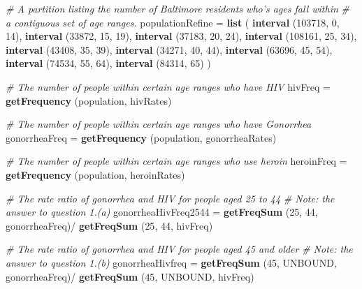 \documentclass[]{article}
\newenvironment{Shaded}{}{}
\newcommand{\CommentTok}[1]{\textcolor[rgb]{0.38,0.63,0.69}{\textit{#1}}}
\newcommand{\DecValTok}[1]{\textcolor[rgb]{0.25,0.63,0.44}{#1}}
\newcommand{\KeywordTok}[1]{\textcolor[rgb]{0.00,0.44,0.13}{\textbf{#1}}}
\newcommand{\NormalTok}[1]{#1}
\newcommand{\OperatorTok}[1]{\textcolor[rgb]{0.40,0.40,0.40}{#1}}
\newcommand{\StringTok}[1]{\textcolor[rgb]{0.25,0.44,0.63}{#1}}
\begin{document}
\begin{Shaded}
\begin{Highlighting}[]
\CommentTok{# A partition listing the number of Baltimore residents who's ages fall within}
\CommentTok{# a contiguous set of age ranges.}
\NormalTok{populationRefine =}\StringTok{ }\KeywordTok{list}\NormalTok{ (}
  \KeywordTok{interval}\NormalTok{ (}\DecValTok{103718}\NormalTok{, }\DecValTok{0}\NormalTok{, }\DecValTok{14}\NormalTok{),}
  \KeywordTok{interval}\NormalTok{ (}\DecValTok{33872}\NormalTok{, }\DecValTok{15}\NormalTok{, }\DecValTok{19}\NormalTok{),}
  \KeywordTok{interval}\NormalTok{ (}\DecValTok{37183}\NormalTok{, }\DecValTok{20}\NormalTok{, }\DecValTok{24}\NormalTok{),}
  \KeywordTok{interval}\NormalTok{ (}\DecValTok{108161}\NormalTok{, }\DecValTok{25}\NormalTok{, }\DecValTok{34}\NormalTok{),}
  \KeywordTok{interval}\NormalTok{ (}\DecValTok{43408}\NormalTok{, }\DecValTok{35}\NormalTok{, }\DecValTok{39}\NormalTok{),}
  \KeywordTok{interval}\NormalTok{ (}\DecValTok{34271}\NormalTok{, }\DecValTok{40}\NormalTok{, }\DecValTok{44}\NormalTok{),}
  \KeywordTok{interval}\NormalTok{ (}\DecValTok{63696}\NormalTok{, }\DecValTok{45}\NormalTok{, }\DecValTok{54}\NormalTok{),}
  \KeywordTok{interval}\NormalTok{ (}\DecValTok{74534}\NormalTok{, }\DecValTok{55}\NormalTok{, }\DecValTok{64}\NormalTok{),}
  \KeywordTok{interval}\NormalTok{ (}\DecValTok{84314}\NormalTok{, }\DecValTok{65}\NormalTok{)}
\NormalTok{)}

\CommentTok{# The number of people within certain age ranges who have HIV }
\NormalTok{hivFreq =}\StringTok{ }\KeywordTok{getFrequency}\NormalTok{ (population, hivRates)}

\CommentTok{# The number of people within certain age ranges who have Gonorrhea}
\NormalTok{gonorrheaFreq =}\StringTok{ }\KeywordTok{getFrequency}\NormalTok{ (population, gonorrheaRates)}

\CommentTok{# The number of people within certain age ranges who use heroin}
\NormalTok{heroinFreq =}\StringTok{ }\KeywordTok{getFrequency}\NormalTok{ (population, heroinRates)}

\CommentTok{# The rate ratio of gonorrhea and HIV for people aged 25 to 44}
\CommentTok{# Note: the answer to question 1.(a)}
\NormalTok{gonorrheaHivFreq2544 =}
\StringTok{  }\KeywordTok{getFreqSum}\NormalTok{ (}\DecValTok{25}\NormalTok{, }\DecValTok{44}\NormalTok{, gonorrheaFreq)}\OperatorTok{/}
\StringTok{  }\KeywordTok{getFreqSum}\NormalTok{ (}\DecValTok{25}\NormalTok{, }\DecValTok{44}\NormalTok{, hivFreq)}

\CommentTok{# The rate ratio of gonorrhea and HIV for people aged 45 and older}
\CommentTok{# Note: the answer to question 1.(b)}
\NormalTok{gonorrheaHivfreq =}
\StringTok{  }\KeywordTok{getFreqSum}\NormalTok{ (}\DecValTok{45}\NormalTok{, UNBOUND, gonorrheaFreq)}\OperatorTok{/}
\StringTok{  }\KeywordTok{getFreqSum}\NormalTok{ (}\DecValTok{45}\NormalTok{, UNBOUND, hivFreq)}


\end{Highlighting}
\end{Shaded}
\end{document}
